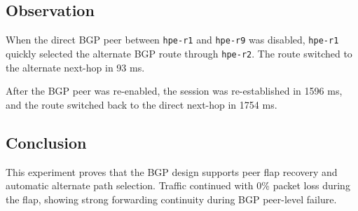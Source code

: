 \subsection{Observation}

When the direct BGP peer between \texttt{hpe-r1} and \texttt{hpe-r9} was disabled, \texttt{hpe-r1} quickly selected the alternate BGP route through \texttt{hpe-r2}. The route switched to the alternate next-hop in 93 ms.

After the BGP peer was re-enabled, the session was re-established in 1596 ms, and the route switched back to the direct next-hop in 1754 ms.

\subsection{Conclusion}

This experiment proves that the BGP design supports peer flap recovery and automatic alternate path selection. Traffic continued with 0\% packet loss during the flap, showing strong forwarding continuity during BGP peer-level failure.
